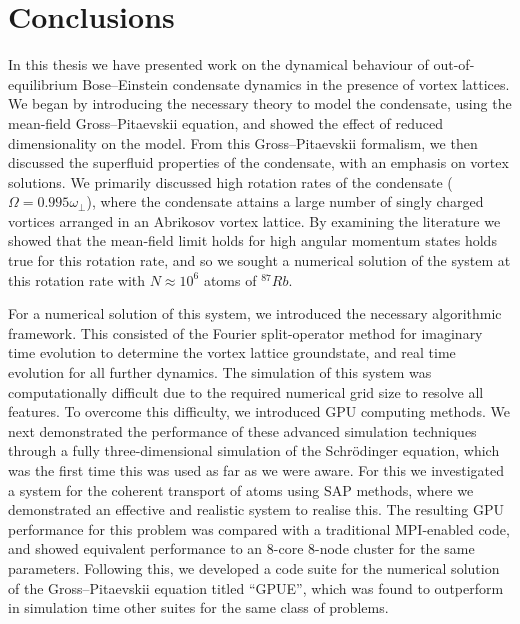 
\section{Conclusions}
In this thesis we have presented work on the dynamical behaviour of out-of-equilibrium Bose--Einstein condensate dynamics in the presence of vortex lattices. We began by introducing the necessary theory to model the condensate, using the mean-field Gross--Pitaevskii equation, and showed the effect of reduced dimensionality on the model. From this Gross--Pitaevskii formalism, we then discussed the superfluid properties of the condensate, with an emphasis on vortex solutions. We primarily discussed high rotation rates of the condensate ($\Omega = 0.995\omega_\perp$), where the condensate attains a large number of singly charged vortices arranged in an Abrikosov vortex lattice. By examining the literature we showed that the mean-field limit holds for high angular momentum states holds true for this rotation rate, and so we sought a numerical solution of the system at this rotation rate with $N\approx 10^{6}$ atoms of $^{87}Rb$.

For a numerical solution of this system, we introduced the necessary algorithmic framework. This consisted of the Fourier split-operator method for imaginary time evolution to determine the vortex lattice groundstate, and real time evolution for all further dynamics. The simulation of this system was computationally difficult due to the required numerical grid size to resolve all features. To overcome this difficulty, we introduced GPU computing methods. We next demonstrated the performance of these advanced simulation techniques through a fully three-dimensional simulation of the Schr\"odinger equation, which was the first time this was used as far as we were aware. For this we investigated a system for the coherent transport of atoms using SAP methods, where we demonstrated an effective and realistic system to realise this. The resulting GPU performance for this problem was compared with a traditional MPI-enabled code, and showed equivalent performance to an 8-core 8-node cluster for the same parameters. Following this, we developed a code suite for the numerical solution of the Gross--Pitaevskii equation titled ``GPUE'', which was found to outperform in simulation time other suites for the same class of problems.

